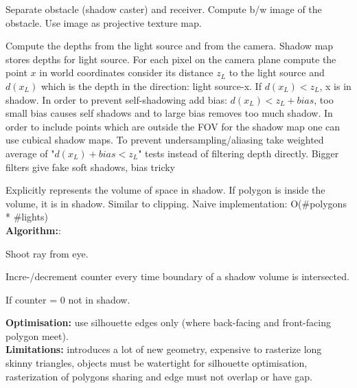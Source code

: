  Separate obstacle (shadow caster) and receiver. Compute b/w image of the obstacle. Use image as projective texture map.

 Compute the depths from the light source and from the camera. Shadow map stores depths for light source. For each pixel on the camera plane compute the point $x$ in world coordinates consider its distance $z_L$ to the light source and $d(x_L)$ which is the depth in the direction: light source-x. If $d(x_L) < z_L$, x is in shadow. In order to prevent self-shadowing add bias: $d(x_L) < z_L + bias$, too small bias causes self shadows and to large bias removes too much shadow. In order to include points which are outside the FOV for the shadow map one can use cubical shadow maps. To prevent undersampling/aliasing take weighted average of "$d(x_L) + bias < z_L$" tests instead of filtering depth directly. Bigger filters give fake soft shadows, bias tricky


 Explicitly represents the volume of space in shadow. If polygon is inside the volume, it is in shadow. Similar to clipping. Naive implementation: O(\#polygons * \#lights)\\
\textbf{Algorithm:}: 
\begin{compactitem}
    \item Shoot ray from eye.
    \item Incre-/decrement counter every time boundary of a shadow volume is intersected.
    \item If counter = 0 not in shadow.
\end{compactitem}
\textbf{Optimisation:} use silhouette edges only (where back-facing and front-facing polygon meet).\\
\textbf{Limitations:} introduces a lot of new geometry, expensive to rasterize long skinny triangles, objects must be watertight for silhouette optimisation, rasterization of polygons sharing and edge must not overlap or have gap.

